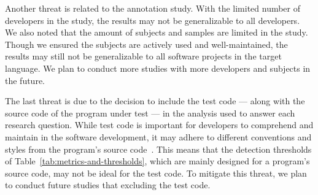 %
Another threat is related to the annotation study. With the limited number of
developers in the study, the results may not be generalizable to all developers.
We also noted that the amount of subjects and samples are limited in the study.
Though we ensured the subjects are actively used and well-maintained, the
results may still not be generalizable to all software projects in the target
language. We plan to conduct more studies with more developers and subjects in
the future.






The last threat is due to the decision to include the test code --- along with
the source code of the program under test --- in the analysis used to answer
each research question. While test code is important for developers to
comprehend and maintain in the software development, it may adhere to different
conventions and styles from the program's source
code~\cite{Kapfhammer2004,Kapfhammer2010}. This means that the detection
thresholds of Table~\ref{tab:metrics-and-thresholds}, which are mainly designed
for a program's source code, may not be ideal for the test code. To mitigate
this threat, we plan to conduct future studies that excluding the test code.
